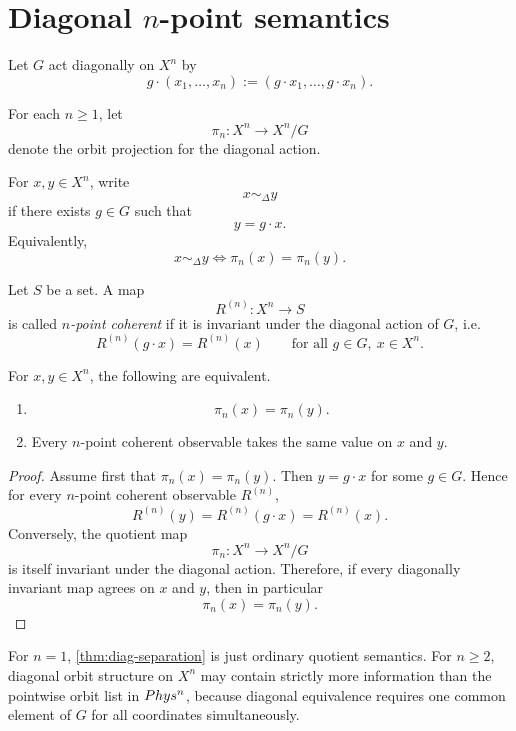 \section{\texorpdfstring{Diagonal \(n\)-point semantics}{Diagonal n-point semantics}}
Let \(G\) act diagonally on \(X^n\) by
\[
	g\cdot(x_1,\dots,x_n):=(g\cdot x_1,\dots,g\cdot x_n).
\]
\begin{definition}
	For each \(n\ge 1\), let
	\[
		\pi_n:X^n\to X^n/G
	\]
	denote the orbit projection for the diagonal action.
\end{definition}
\begin{definition}
	For \(x,y\in X^n\), write
	\[
		x\sim_\Delta y
	\]
	if there exists \(g\in G\) such that
	\[
		y=g\cdot x.
	\]
	Equivalently,
	\[
		x\sim_\Delta y
		\iff
		\pi_n(x)=\pi_n(y).
	\]
\end{definition}
\begin{definition}
	Let \(S\) be a set. A map
	\[
		R^{(n)}:X^n\to S
	\]
	is called \emph{\(n\)-point coherent} if it is invariant under the
	diagonal action of \(G\), i.e.
	\[
		R^{(n)}(g\cdot x)=R^{(n)}(x)
		\qquad
		\text{for all }g\in G,\ x\in X^n.
	\]
\end{definition}
\begin{theorem}
	\label{thm:diag-separation}
	For \(x,y\in X^n\), the following are equivalent.
	\begin{enumerate}
		\item
		      \[
			      \pi_n(x)=\pi_n(y).
		      \]
		\item Every \(n\)-point coherent observable takes the same value on
		      \(x\) and \(y\).
	\end{enumerate}
\end{theorem}
\begin{proof}
	Assume first that \(\pi_n(x)=\pi_n(y)\). Then \(y=g\cdot x\) for some
	\(g\in G\). Hence for every \(n\)-point coherent observable
	\(R^{(n)}\),
	\[
		R^{(n)}(y)=R^{(n)}(g\cdot x)=R^{(n)}(x).
	\]
	Conversely, the quotient map
	\[
		\pi_n:X^n\to X^n/G
	\]
	is itself invariant under the diagonal action. Therefore, if every
	diagonally invariant map agrees on \(x\) and \(y\), then in particular
	\[
		\pi_n(x)=\pi_n(y).
	\]
\end{proof}
\begin{remark}
	For \(n=1\), \cref{thm:diag-separation} is just ordinary quotient
	semantics. For \(n\ge 2\), diagonal orbit structure on \(X^n\) may
	contain strictly more information than the pointwise orbit list in
	\(Phys^n\), because diagonal equivalence requires one common element of
	\(G\) for all coordinates simultaneously.
\end{remark}
